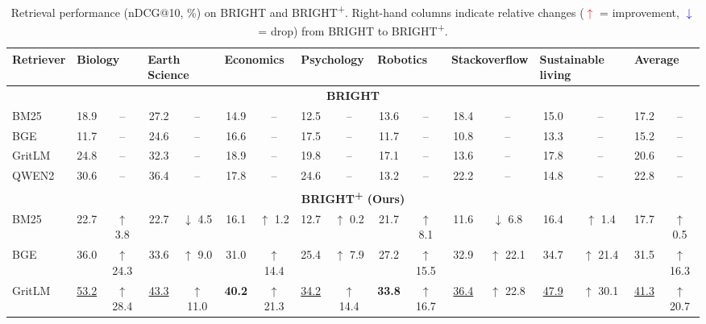 \documentclass[11pt]{article}
\begin{document}
\begin{table}[t]
\centering
\caption{
Retrieval performance (nDCG@10, \%) on BRIGHT and BRIGHT\textsuperscript{+}. Right-hand columns indicate relative changes (\textcolor{red}{$\uparrow$} = improvement, \textcolor{blue}{$\downarrow$} = drop) from BRIGHT to BRIGHT\textsuperscript{+}.
}

\label{tab:bright-vs-brightplus}
\footnotesize
\begin{adjustbox}{width=1.0\linewidth}
\begin{tabular}{l*{8}{c c}}
\toprule
\textbf{Retriever} &
\multicolumn{2}{l}{Biology} &
\multicolumn{2}{l}{Earth Science} &
\multicolumn{2}{l}{Economics} &
\multicolumn{2}{l}{Psychology} &
\multicolumn{2}{l}{Robotics} &
\multicolumn{2}{l}{Stackoverflow} &
\multicolumn{2}{l}{Sustainable living} &
\multicolumn{2}{l}{Average}\\
\midrule
\multicolumn{17}{c}{\textbf{BRIGHT}}\\
\midrule
BM25   & 18.9 & -- & 27.2 & -- & 14.9 & -- & 12.5 & -- & 13.6 & -- & 18.4 & -- & 15.0 & -- & 17.2 & -- \\
BGE    & 11.7 & -- & 24.6 & -- & 16.6 & -- & 17.5 & -- & 11.7 & -- & 10.8 & -- & 13.3 & -- & 15.2 & -- \\
GritLM & 24.8 & -- & 32.3 & -- & 18.9 & -- & 19.8 & -- & 17.1 & -- & 13.6 & -- & 17.8 & -- & 20.6 & -- \\
QWEN2   & 30.6 & -- & 36.4 & -- & 17.8 & -- & 24.6 & -- & 13.2 & -- & 22.2 & -- & 14.8 & -- & 22.8 & -- \\
\midrule
\multicolumn{17}{c}{\textbf{BRIGHT\textsuperscript{+} (Ours)}}\\
\midrule
BM25   & 22.7 & {\color{red}$\uparrow$ 3.8} & 22.7 & {\color{blue}$\downarrow$ 4.5} & 16.1 & {\color{red}$\uparrow$ 1.2} & 12.7 & {\color{red}$\uparrow$ 0.2} & 21.7 & {\color{red}$\uparrow$ 8.1} & 11.6 & {\color{blue}$\downarrow$ 6.8} & 16.4 & {\color{red}$\uparrow$ 1.4} & 17.7 & {\color{red}$\uparrow$ 0.5} \\[2pt]
BGE    & 36.0 & {\color{red}$\uparrow$ 24.3} & 33.6 & {\color{red}$\uparrow$ 9.0}  & 31.0 & {\color{red}$\uparrow$ 14.4} & 25.4 & {\color{red}$\uparrow$ 7.9} & 27.2 & {\color{red}$\uparrow$ 15.5} & 32.9 & {\color{red}$\uparrow$ 22.1} & 34.7 & {\color{red}$\uparrow$ 21.4} & 31.5 & {\color{red}$\uparrow$ 16.3} \\[2pt]
GritLM & \underline{53.2} & {\color{red}$\uparrow$ 28.4} & \underline{43.3} & {\color{red}$\uparrow$ 11.0} & \textbf{40.2} & {\color{red}$\uparrow$ 21.3} & \underline{34.2} & {\color{red}$\uparrow$ 14.4} & \textbf{33.8} & {\color{red}$\uparrow$ 16.7} & \underline{36.4} & {\color{red}$\uparrow$ 22.8} & \underline{47.9} & {\color{red}$\uparrow$ 30.1} & \underline{41.3} & {\color{red}$\uparrow$ 20.7} \\[2pt]

\end{tabular}
\end{adjustbox}
\end{table}
\end{document}
